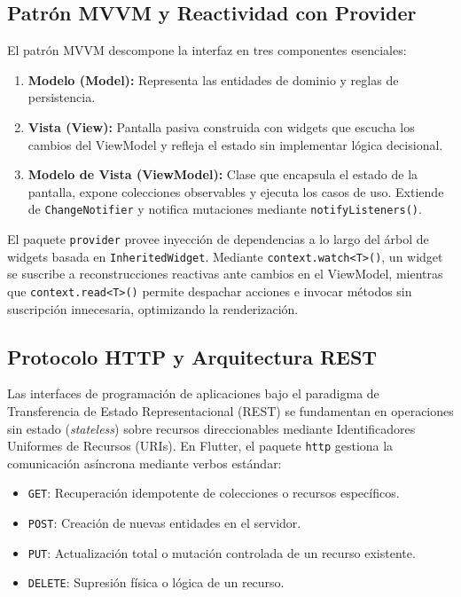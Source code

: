 \documentclass[12pt,a4paper]{article}
\begin{document}
\subsection{Patrón MVVM y Reactividad con Provider}
El patrón MVVM descompone la interfaz en tres componentes esenciales:
\begin{enumerate}
    \item \textbf{Modelo (Model):} Representa las entidades de dominio y reglas de persistencia.
    \item \textbf{Vista (View):} Pantalla pasiva construida con widgets que escucha los cambios del ViewModel y refleja el estado sin implementar lógica decisional.
    \item \textbf{Modelo de Vista (ViewModel):} Clase que encapsula el estado de la pantalla, expone colecciones observables y ejecuta los casos de uso. Extiende de \texttt{ChangeNotifier} y notifica mutaciones mediante \texttt{notifyListeners()}.
\end{enumerate}

El paquete \texttt{provider} provee inyección de dependencias a lo largo del árbol de widgets basada en \texttt{InheritedWidget}. Mediante \texttt{context.watch<T>()}, un widget se suscribe a reconstrucciones reactivas ante cambios en el ViewModel, mientras que \texttt{context.read<T>()} permite despachar acciones e invocar métodos sin suscripción innecesaria, optimizando la renderización.

\subsection{Protocolo HTTP y Arquitectura REST}
Las interfaces de programación de aplicaciones bajo el paradigma de Transferencia de Estado Representacional (REST) se fundamentan en operaciones sin estado (\textit{stateless}) sobre recursos direccionables mediante Identificadores Uniformes de Recursos (URIs). En Flutter, el paquete \texttt{http} gestiona la comunicación asíncrona mediante verbos estándar:
\begin{itemize}
    \item \texttt{GET}: Recuperación idempotente de colecciones o recursos específicos.
    \item \texttt{POST}: Creación de nuevas entidades en el servidor.
    \item \texttt{PUT}: Actualización total o mutación controlada de un recurso existente.
    \item \texttt{DELETE}: Supresión física o lógica de un recurso.
\end{itemize}
\end{document}
